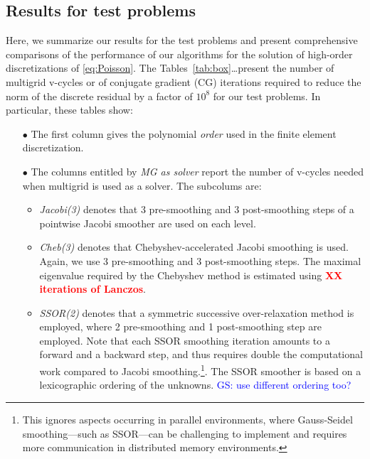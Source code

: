 \documentclass[smallcondensed,final]{svjour3}     %
\newcommand{\todo}[1]{\textcolor{red}{\bf #1}}
\newcommand{\gsnote}[1]{\textcolor{blue}{GS: #1}}
\begin{document}
\subsection{Results for test problems}\label{subsec:results}
Here, we summarize our results for the test problems and present
comprehensive comparisons of the performance of our algorithms for the
solution of high-order discretizations of \eqref{eq:Poisson}.  The
Tables~\ref{tab:box}\ldots present the number of multigrid v-cycles or
of conjugate gradient (CG) iterations required to reduce the norm of
the discrete residual by a factor of $10^8$ for our test problems. In
particular, these tables show:
\begin{itemize}
\item[$\bullet$] The first column gives the polynomial \emph{order}
  used in the finite element discretization.
\item[$\bullet$] The columns entitled by \emph{MG as solver} report
  the number of v-cycles needed when multigrid is used as a
  solver. The subcolums are:
  \begin{itemize}
  \item \emph{Jacobi(3)} denotes that 3 pre-smoothing and 3
    post-smoothing steps of a pointwise Jacobi smoother are used on
    each level.
  \item \emph{Cheb(3)} denotes that Chebyshev-accelerated Jacobi
    smoothing is used. Again, we use 3 pre-smoothing and 3
    post-smoothing steps. The maximal eigenvalue required by the
    Chebyshev method is estimated using \todo{XX iterations of
      Lanczos}.
  \item \emph{SSOR(2)} denotes that a symmetric successive
    over-relaxation method is employed, where 2 pre-smoothing and 1
    post-smoothing step are employed. Note that each SSOR smoothing
    iteration amounts to a forward and a backward step, and thus
    requires double the computational work compared to Jacobi
    smoothing.\footnote{This ignores aspects occurring in parallel
      environments, where Gauss-Seidel smoothing---such as SSOR---can
      be challenging to implement and requires more communication in
      distributed memory environments.}. The SSOR smoother is based on 
			a lexicographic ordering of  the unknowns. 
			\gsnote{use different ordering too?}
	\end{itemize}
	

\end{itemize}
\end{document}
